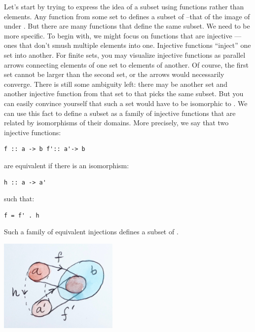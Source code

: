 Let's start by trying to express the idea of a subset using functions
rather than elements. Any function  from some set 
to  defines a subset of --that of the image of
 under . But there are many functions that define
the same subset. We need to be more specific. To begin with, we might
focus on functions that are injective --- ones that don't smush multiple
elements into one. Injective functions ``inject'' one set into another.
For finite sets, you may visualize injective functions as parallel
arrows connecting elements of one set to elements of another. Of course,
the first set cannot be larger than the second set, or the arrows would
necessarily converge. There is still some ambiguity left: there may be
another set  and another injective function
 from that set to  that picks the same
subset. But you can easily convince yourself that such a set would have
to be isomorphic to . We can use this fact to define a subset
as a family of injective functions that are related by isomorphisms of
their domains. More precisely, we say that two injective functions:

\begin{Verbatim}[commandchars=\\\{\}]
f :: a -> b f':: a'-> b
\end{Verbatim}

are equivalent if there is an isomorphism:

\begin{Verbatim}[commandchars=\\\{\}]
h :: a -> a'
\end{Verbatim}

such that:

\begin{Verbatim}[commandchars=\\\{\}]
f = f' . h
\end{Verbatim}

Such a family of equivalent injections defines a subset of .

\includegraphics[width=2.29167in]{images/subsetinjection.jpg}


